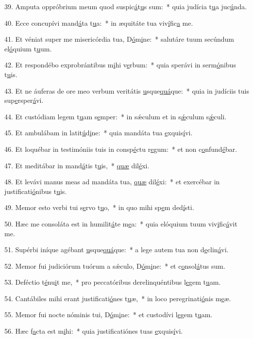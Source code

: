 39. Amputa oppróbrium meum quod suspic\uline{á}t\uline{u}s sum:~* quia judícia t\uline{u}a juc\uline{ú}nda.\par 
40. Ecce concupívi mand\uline{á}ta t\uline{u}a:~* in æquitáte tua viv\uline{í}fic\uline{a} me.\par 
41. Et véniat super me misericórdia tua, D\uline{ó}m\uline{i}ne:~* salutáre tuum secúndum el\uline{ó}quium t\uline{u}um.\par 
42. Et respondébo exprobrántibus m\uline{i}hi v\uline{e}rbum:~* quia sperávi in serm\uline{ó}nibus t\uline{u}is.\par 
43. Et ne áuferas de ore meo verbum veritátis \uline{u}sque\uline{quá}que:~* quia in judíciis tuis sup\uline{e}rsper\uline{á}vi.\par 
44. Et custódiam legem t\uline{u}am s\uline{e}mper:~* in sǽculum et in s\uline{ǽ}culum s\uline{ǽ}culi.\par 
45. Et ambulábam in latit\uline{ú}d\uline{i}ne:~* quia mandáta tua \uline{e}xquis\uline{í}vi.\par 
46. Et loquébar in testimóniis tuis in consp\uline{é}ctu r\uline{e}gum:~* et non c\uline{o}nfund\uline{é}bar.\par 
47. Et meditábar in mand\uline{á}tis t\uline{u}is,~* \uline{quæ} dil\uline{é}xi.\par 
48. Et levávi manus meas ad mandáta tua, \uline{quæ} dil\uline{é}xi:~* et exercébar in justificati\uline{ó}nibus t\uline{u}is.\par 
49. Memor esto verbi tui s\uline{e}rvo t\uline{u}o,~* in quo mihi sp\uline{e}m ded\uline{í}sti.\par 
50. Hæc me consoláta est in humilit\uline{á}te m\uline{e}a:~* quia elóquium tuum viv\uline{i}fic\uline{á}vit me.\par 
51. Supérbi iníque agébant \uline{u}sque\uline{quá}que:~* a lege autem tua non d\uline{e}clin\uline{á}vi.\par 
52. Memor fui judiciórum tuórum a sǽculo, D\uline{ó}m\uline{i}ne:~* et c\uline{o}nsol\uline{á}tus sum.\par 
53. Deféctio t\uline{é}nu\uline{i}t me,~* pro peccatóribus derelinquéntibus l\uline{e}gem t\uline{u}am.\par 
54. Cantábiles mihi erant justificati\uline{ó}nes t\uline{u}æ,~* in loco peregrinati\uline{ó}nis m\uline{e}æ.\par 
55. Memor fui nocte nóminis tui, D\uline{ó}m\uline{i}ne:~* et custodívi l\uline{e}gem t\uline{u}am.\par 
56. Hæc f\uline{a}cta est m\uline{i}hi:~* quia justificatiónes tuas \uline{e}xquis\uline{í}vi.\par 

